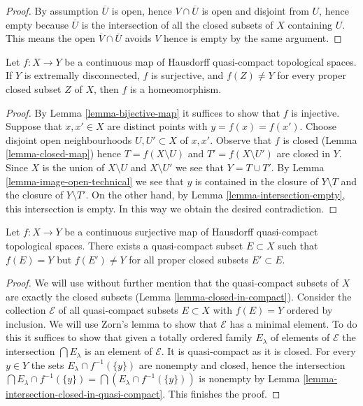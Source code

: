 \begin{proof}
By assumption $\overline{U}$ is open, hence $V \cap \overline{U}$
is open and disjoint from $U$, hence empty because $\overline{U}$
is the intersection of all the closed subsets of $X$ containing $U$.
This means the open $\overline{V} \cap \overline{U}$ avoids $V$
hence is empty by the same argument.
\end{proof}

\begin{lemma}
\label{lemma-isomorphism}
Let $f : X \to Y$ be a continuous map of Hausdorff quasi-compact
topological spaces. If $Y$ is extremally disconnected, $f$ is surjective,
and $f(Z) \not = Y$ for every proper closed subset $Z$ of $X$, then
$f$ is a homeomorphism.
\end{lemma}

\begin{proof}
By Lemma \ref{lemma-bijective-map} it suffices to show that $f$ is injective.
Suppose that $x, x' \in X$ are distinct points with $y = f(x) = f(x')$.
Choose disjoint open neighbourhoods $U, U' \subset X$ of $x, x'$.
Observe that $f$ is closed (Lemma \ref{lemma-closed-map}) hence
$T = f(X \setminus U)$ and $T' = f(X \setminus U')$ are closed in $Y$.
Since $X$ is the union of $X \setminus U$ and $X \setminus U'$ we see that
$Y = T \cup T'$. By Lemma \ref{lemma-image-open-technical} we
see that $y$ is contained in the closure of $Y \setminus T$ and
the closure of $Y \setminus T'$. On the other hand, by
Lemma \ref{lemma-intersection-empty},
this intersection is empty. In this way we obtain the desired contradiction.
\end{proof}

\begin{lemma}
\label{lemma-find-compact-subset}
Let $f : X \to Y$ be a continuous surjective map of Hausdorff quasi-compact
topological spaces. There exists a quasi-compact subset $E \subset X$
such that $f(E) = Y$ but $f(E') \not = Y$ for all proper closed subsets
$E' \subset E$.
\end{lemma}

\begin{proof}
We will use without further mention that the quasi-compact subsets
of $X$ are exactly the closed subsets
(Lemma \ref{lemma-closed-in-compact}).
Consider the collection $\mathcal{E}$ of all quasi-compact subsets
$E \subset X$ with $f(E) = Y$ ordered by inclusion. We will use
Zorn's lemma to show that
$\mathcal{E}$ has a minimal element. To do this it suffices to show
that given a totally ordered family $E_\lambda$ of elements of $\mathcal{E}$
the intersection $\bigcap E_\lambda$ is an element of $\mathcal{E}$.
It is quasi-compact as it is closed.
For every $y \in Y$ the sets $E_\lambda \cap f^{-1}(\{y\})$
are nonempty and closed, hence the intersection
$\bigcap E_\lambda \cap f^{-1}(\{y\}) = \bigcap (E_\lambda \cap f^{-1}(\{y\}))$
is nonempty by
Lemma \ref{lemma-intersection-closed-in-quasi-compact}.
This finishes the proof.
\end{proof}

